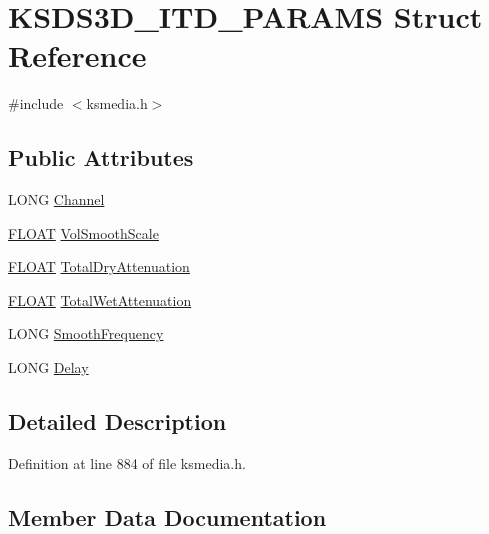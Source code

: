 \hypertarget{struct_k_s_d_s3_d___i_t_d___p_a_r_a_m_s}{}\section{K\+S\+D\+S3\+D\+\_\+\+I\+T\+D\+\_\+\+P\+A\+R\+A\+MS Struct Reference}
\label{struct_k_s_d_s3_d___i_t_d___p_a_r_a_m_s}


{\ttfamily \#include $<$ksmedia.\+h$>$}

\subsection*{Public Attributes}
\begin{DoxyCompactItemize}
\item 
L\+O\+NG \hyperlink{struct_k_s_d_s3_d___i_t_d___p_a_r_a_m_s_ad79a578ce5725b3fc2bf2ec8db6e0179}{Channel}
\item 
\hyperlink{twolame_2libtwolame_2common_8h_ae8690abbffa85934d64d545920e2b108}{F\+L\+O\+AT} \hyperlink{struct_k_s_d_s3_d___i_t_d___p_a_r_a_m_s_a572985124e30e30adb8bbf83b419a970}{Vol\+Smooth\+Scale}
\item 
\hyperlink{twolame_2libtwolame_2common_8h_ae8690abbffa85934d64d545920e2b108}{F\+L\+O\+AT} \hyperlink{struct_k_s_d_s3_d___i_t_d___p_a_r_a_m_s_abf337075f7e9e11ec8162595bab2c84d}{Total\+Dry\+Attenuation}
\item 
\hyperlink{twolame_2libtwolame_2common_8h_ae8690abbffa85934d64d545920e2b108}{F\+L\+O\+AT} \hyperlink{struct_k_s_d_s3_d___i_t_d___p_a_r_a_m_s_a5cd34e3a8f8efc60190fc8813cd8da65}{Total\+Wet\+Attenuation}
\item 
L\+O\+NG \hyperlink{struct_k_s_d_s3_d___i_t_d___p_a_r_a_m_s_ae2f7b1e0674cb40a1e8e80f81fe0de57}{Smooth\+Frequency}
\item 
L\+O\+NG \hyperlink{struct_k_s_d_s3_d___i_t_d___p_a_r_a_m_s_a80a210d6784402a2998a0a5884e3e4d4}{Delay}
\end{DoxyCompactItemize}


\subsection{Detailed Description}


Definition at line 884 of file ksmedia.\+h.



\subsection{Member Data Documentation}
